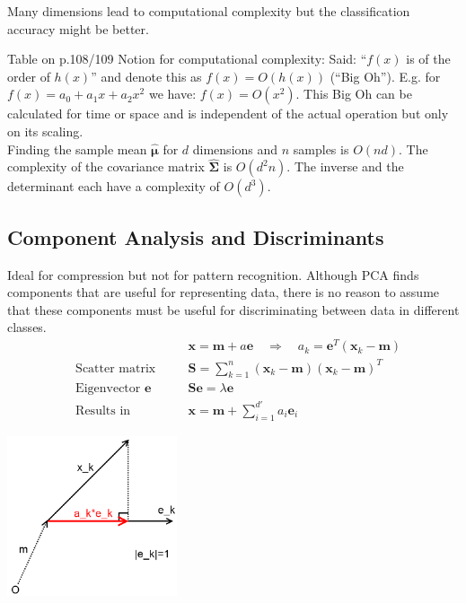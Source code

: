   
  Many dimensions lead to computational complexity but the classification accuracy might be better.
  
  Table on p.108/109
  Notion for computational complexity: Said: ``$f(x)$ is of the order of $h(x)$'' and denote this as
  $f(x) = O(h(x))$ (``Big Oh''). E.g. for $f(x) = a_0+a_1x+a_2x^2$ we have: $f(x) = O(x^2)$.
  This Big Oh can be calculated for time or space and is independent of the actual operation but
  only on its scaling. \\
  
  Finding the sample mean $\hat{\boldsymbol{\mu}}$ for $d$ dimensions and $n$ samples is $O(nd)$.
  The complexity of the covariance matrix $\hat{\boldsymbol{\Sigma}}$ is $O(d^2n)$. 
  The inverse and the determinant each have a complexity of $O(d^3)$.
  
  \subsection{Component Analysis and Discriminants}
  
  \begin{minipage}{13cm}
  
  Ideal for compression but not for pattern recognition.
  Although PCA finds components that are useful for representing data, there is no reason to 
  assume that these components must be useful for discriminating between data in different classes.\\
  \begin{align*}
	&  && \bm{x}=\bm{m}+a \bm{e} \quad \Rightarrow \quad a_k=\bm{e}^T(\bm{x}_k-\bm{m}) \\
    &\text{Scatter matrix} \quad && \bm{S} = \sum\limits_{k=1}^{n}{(\bm{x}_k-\bm{m})(\bm{x}_k-\bm{m})^T} \\
    &\text{Eigenvector } \bm{e} \quad && \bm{S e}=\lambda \bm{e} \\
    &\text{Results in} && \bm{x}=\bm{m}+\sum\limits_{i=1}^{d'}{a_i \bm{e}_i}
  \end{align*}

  \end{minipage}
  \begin{minipage}{5cm}
  	\includegraphics[width=5cm]{./images/principalComp.png}
  \end{minipage} 
  
